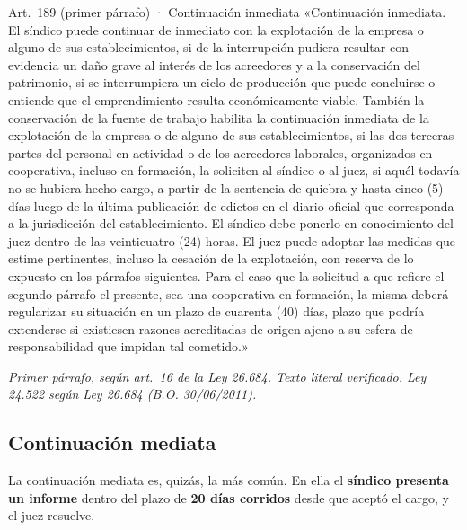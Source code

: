 \documentclass[12pt,oneside]{book}
\begin{document}
\begin{norma}{Art.~189 (primer párrafo) · Continuación inmediata}
«Continuación inmediata. El síndico puede continuar de inmediato con la explotación de la empresa o alguno de sus establecimientos, si de la interrupción pudiera resultar con evidencia un daño grave al interés de los acreedores y a la conservación del patrimonio, si se interrumpiera un ciclo de producción que puede concluirse o entiende que el emprendimiento resulta económicamente viable. También la conservación de la fuente de trabajo habilita la continuación inmediata de la explotación de la empresa o de alguno de sus establecimientos, si las dos terceras partes del personal en actividad o de los acreedores laborales, organizados en cooperativa, incluso en formación, la soliciten al síndico o al juez, si aquél todavía no se hubiera hecho cargo, a partir de la sentencia de quiebra y hasta cinco (5) días luego de la última publicación de edictos en el diario oficial que corresponda a la jurisdicción del establecimiento. El síndico debe ponerlo en conocimiento del juez dentro de las veinticuatro (24) horas. El juez puede adoptar las medidas que estime pertinentes, incluso la cesación de la explotación, con reserva de lo expuesto en los párrafos siguientes. Para el caso que la solicitud a que refiere el segundo párrafo el presente, sea una cooperativa en formación, la misma deberá regularizar su situación en un plazo de cuarenta (40) días, plazo que podría extenderse si existiesen razones acreditadas de origen ajeno a su esfera de responsabilidad que impidan tal cometido.»

\par\smallskip\textit{Primer párrafo, según art.~16 de la Ley 26.684. Texto literal verificado. Ley 24.522 según Ley 26.684 (B.O. 30/06/2011).}
\end{norma}

\subsection{Continuación mediata}

La continuación mediata es, quizás, la más común. En ella el \textbf{síndico presenta un informe} dentro del plazo de \textbf{20 días corridos} desde que aceptó el cargo, y el juez resuelve.
\end{document}
